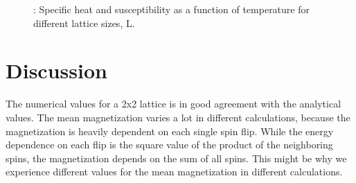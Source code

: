 \documentclass{article}
\begin{document}
{{{				\begin{figure}[H]
				\caption{: Specific heat and susceptibility as a function of temperature for different lattice sizes, L.}
				\label{fig:heat_susc}
				\end{figure}



\newpage
\section{Discussion}

	The numerical values for a 2x2 lattice is in good agreement with the analytical values. The mean magnetization varies a lot in different calculations, because the magnetization is heavily dependent on each single spin flip. While the energy dependence on each flip is the square value of the product of the neighboring spins, the magnetization depends on the sum of all spins. This might be why we experience different values for the mean magnetization in different calculations.\\

}}}
\end{document}
